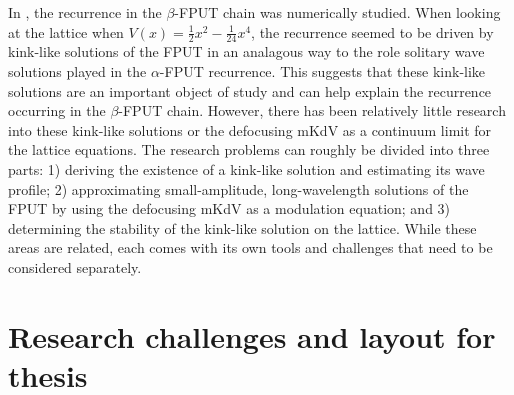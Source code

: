 In \cite{pace2019beta}, the recurrence in the \(\beta\)-FPUT chain was numerically studied. When looking at the lattice when \(V(x) = \frac  12 x^2 - \frac 1 {24}x^4\), the recurrence seemed to be driven by kink-like solutions of the FPUT in an analagous way to the role solitary wave solutions played in the \(\alpha\)-FPUT recurrence. This suggests that these kink-like solutions are an important object of study and can help explain the recurrence occurring in the \(\beta\)-FPUT chain. However, there has been relatively little research into these kink-like solutions or the defocusing mKdV as a continuum limit for the lattice equations. The research problems can roughly be divided into three parts: 1) deriving the existence of a kink-like solution and estimating its wave profile; 2) approximating small-amplitude, long-wavelength solutions of the FPUT by using the defocusing mKdV as a modulation equation; and 3) determining the stability of the kink-like solution on the lattice. While these areas are related, each comes with its own tools and challenges that need to be considered separately. 


\section{Research challenges and layout for thesis}

